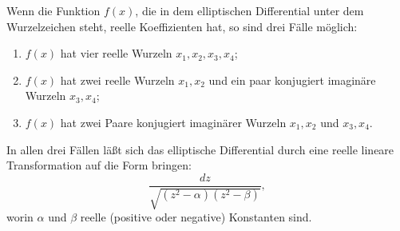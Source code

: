 \documentclass[11pt]{article}
\begin{document}
Wenn die Funktion $f(x)$, die in dem elliptischen Differential unter dem Wurzelzeichen steht, reelle Koeffizienten hat, so sind drei Fälle möglich:
\begin{enumerate}[label=\arabic*.]
\item $f(x)$ hat vier reelle Wurzeln $x_1,x_2,x_3,x_4$;
\item $f(x)$ hat zwei reelle Wurzeln $x_1,x_2$ und ein paar konjugiert imaginäre Wurzeln $x_3,x_4$;
\item $f(x)$ hat zwei Paare konjugiert imaginärer Wurzeln $x_1,x_2$ und $x_3,x_4$.
\end{enumerate}
In allen drei Fällen läßt sich das elliptische Differential durch eine reelle lineare Transformation auf die Form bringen:
\begin{equation}
\frac{dz}{\sqrt{(z^2-\alpha)(z^2-\beta)}},
\tag{1}
\end{equation}
worin $\alpha$ und $\beta$ reelle (positive oder negative) Konstanten sind.
\end{document}
